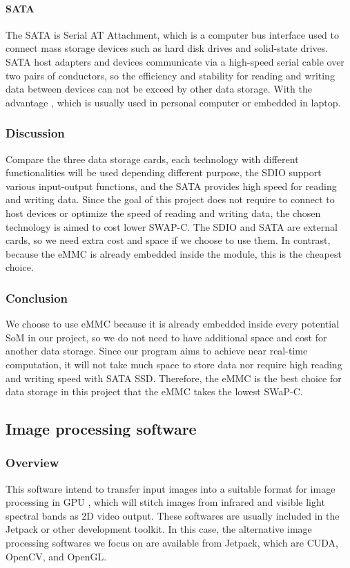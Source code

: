 \paragraph{SATA}
The SATA is Serial AT Attachment, which is a computer bus interface used to connect mass storage 
devices such as hard disk drives and solid-state drives. SATA host adapters and devices communicate 
via a high-speed serial cable over two pairs of conductors, so the efficiency and stability for 
reading and writing data between devices can not be exceed by other data storage. With the advantage
, which is usually used in personal computer or embedded in laptop. \\

\subsubsection{Discussion}
Compare the three data storage cards, each technology with different functionalities will be used 
depending different purpose, the SDIO support various input-output functions, and the SATA provides high 
speed for reading and writing data. Since the goal of this project does not require to connect to host 
devices or optimize the speed of reading and writing data, the chosen technology is aimed to cost lower 
SWAP-C. The SDIO and SATA are external cards, so we need extra cost and space if we choose to use them. 
In contrast, because the eMMC is already embedded inside the module, this is the cheapest choice.\\

\subsubsection{Conclusion}
We choose to use eMMC because it is already embedded inside every potential SoM in our project, so we do 
not need to have additional space and cost for another data storage. Since our program aims to achieve 
near real-time computation, it will not take much space to store data nor require high reading and 
writing speed with SATA SSD. Therefore, the eMMC is the best choice for data storage in this project that 
the eMMC takes the lowest SWaP-C.\\



\subsection{Image processing software}
\subsubsection{Overview}
This software intend to transfer input images into a suitable format for image processing in GPU
, which will stitch images from infrared and visible light spectral bands as 2D video output. 
These softwares are usually included in the Jetpack or other development toolkit. In this case, 
the alternative image processing softwares we focus on are available from Jetpack, which are CUDA, 
OpenCV, and OpenGL.\\


